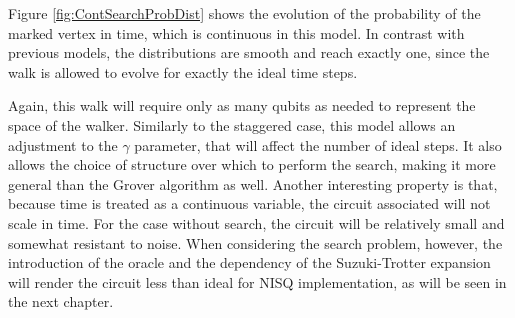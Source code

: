 \documentclass[../../dissertation.tex]{subfiles}
\begin{document}
Figure \ref{fig:ContSearchProbDist} shows the evolution of the probability of the
marked vertex in time, which is continuous in this model. In contrast with
previous models, the distributions are smooth and reach exactly one, since the
walk is allowed to evolve for exactly the ideal time steps.\par

Again, this walk will require only as many qubits as needed to represent the
space of the walker. Similarly to the staggered case, this model allows an
adjustment to the $\gamma$ parameter, that will affect the number of ideal
steps. It also allows the choice of structure over which to perform the
search, making it more general than the Grover algorithm as well. Another
interesting property is that, because time is treated as a continuous variable,
the circuit associated will not scale in time. For the case without
search, the circuit will be relatively small and somewhat resistant to noise.
When considering the search problem, however, the introduction of the oracle
and the dependency of the Suzuki-Trotter expansion will render the circuit less
than ideal for NISQ implementation, as will be seen in the next chapter.
\end{document}
